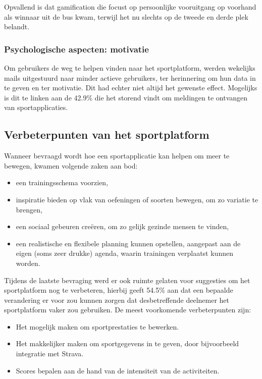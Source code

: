 Opvallend is dat gamification die focust op persoonlijke vooruitgang op voorhand als winnaar uit de bus kwam, terwijl het nu slechts op de tweede en derde plek belandt.

\subsubsection{Psychologische aspecten: motivatie}

Om gebruikers de weg te helpen vinden naar het sportplatform, werden wekelijks mails uitgestuurd naar minder actieve gebruikers, ter herinnering om hun data in te geven en ter motivatie. Dit had echter niet altijd het gewenste effect.
Mogelijks is dit te linken aan de 42.9\% die het storend vindt om meldingen te ontvangen van sportapplicaties.

\subsection{Verbeterpunten van het sportplatform}
\label{ssec:verbeterpunten}

Wanneer bevraagd wordt hoe een sportapplicatie kan helpen om meer te bewegen, kwamen volgende zaken aan bod:

\begin{itemize}
    \item een trainingsschema voorzien,
    \item inspiratie bieden op vlak van oefeningen of soorten bewegen, om zo variatie te brengen,
    \item een sociaal gebeuren creëren, om zo gelijk gezinde mensen te vinden,
    \item een realistische en flexibele planning kunnen opstellen, aangepast aan de eigen (soms zeer drukke) agenda, waarin trainingen verplaatst kunnen worden.
\end{itemize}

Tijdens de laatste bevraging werd er ook ruimte gelaten voor suggesties om het sportplatform nog te verbeteren, hierbij geeft 54.5\% aan dat een bepaalde verandering er voor zou kunnen zorgen dat desbetreffende deelnemer het sportplatform vaker zou gebruiken. De meest voorkomende verbeterpunten zijn:

\begin{itemize}
  \item Het mogelijk maken om sportprestaties te bewerken.
  \item Het makkelijker maken om sportgegevens in te geven, door bijvoorbeeld integratie met Strava.
  \item Scores bepalen aan de hand van de intensiteit van de activiteiten.
\end{itemize}